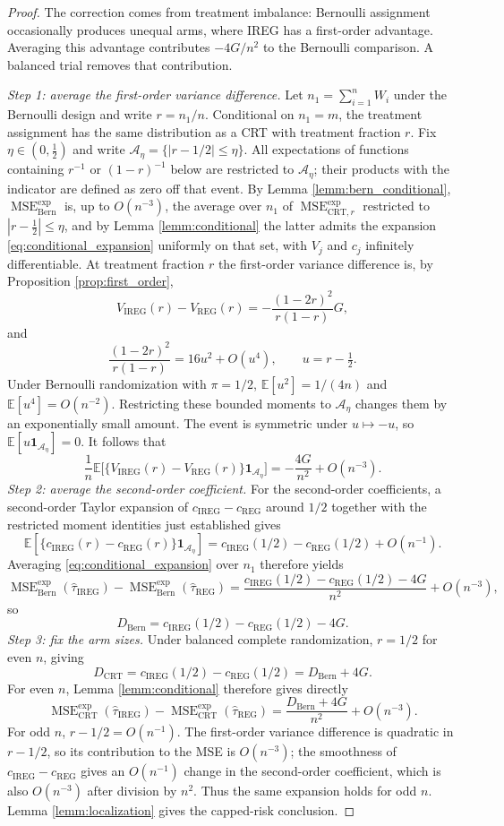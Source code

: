 \documentclass{article}
\newcommand{\EEE}{\mathbb{E}}
\DeclareMathOperator{\MSE}{MSE}
\newcommand{\Bern}{\mathrm{Bern}}
\newcommand{\CRT}{\mathrm{CRT}}
\newcommand{\IREG}{\mathrm{IREG}}
\newcommand{\REG}{\mathrm{REG}}
\newcommand{\MSEexp}{\MSE^{\mathrm{exp}}}
\theoremstyle{plain}
\theoremstyle{definition}
\theoremstyle{remark}
\begin{document}
\begin{proof}
The correction comes from treatment imbalance: Bernoulli assignment
occasionally produces unequal arms, where IREG has a first-order
advantage. Averaging this advantage contributes $-4G/n^2$ to the
Bernoulli comparison. A balanced trial removes that contribution.

\emph{Step 1: average the first-order variance difference.}
Let $n_1=\sum_{i=1}^n W_i$ under the Bernoulli design and write
$r=n_1/n$. Conditional on $n_1=m$, the treatment assignment has the same distribution as a CRT with treatment fraction $r$. Fix
$\eta\in(0,\frac12)$ and write
$\mathcal A_\eta=\{|r-1/2|\le\eta\}$. All expectations of
functions containing $r^{-1}$ or $(1-r)^{-1}$ below are restricted to
$\mathcal A_\eta$; their products with the indicator are defined
as zero off that event. By Lemma \ref{lemm:bern_conditional}, $\MSEexp_\Bern$ is, up to $O(n^{-3})$, the average over $n_1$ of
$\MSEexp_{\CRT,r}$ restricted to $|r-\frac12|\le\eta$, and by Lemma \ref{lemm:conditional} the latter admits the expansion \eqref{eq:conditional_expansion} uniformly on that set, with $V_j$ and $c_j$ infinitely differentiable. At treatment fraction $r$ the first-order variance difference is, by Proposition
\ref{prop:first_order},
\[
V_{\IREG}(r)-V_{\REG}(r)
=
-\frac{(1-2r)^2}{r(1-r)}G,
\]
and
\[
\frac{(1-2r)^2}{r(1-r)}
=
16u^2+O(u^4),
\qquad
u=r-\tfrac12.
\]
Under Bernoulli randomization with $\pi=1/2$,
$\EEE[u^2]=1/(4n)$ and $\EEE[u^4]=O(n^{-2})$.
Restricting these bounded moments to $\mathcal A_\eta$ changes
them by an exponentially small amount. The event is symmetric under
$u\mapsto-u$, so $\EEE[u\mathbf 1_{\mathcal A_\eta}]=0$.
It follows that
\[
\frac{1}{n}
\EEE\big[\{V_{\IREG}(r)-V_{\REG}(r)\}\mathbf 1_{\mathcal A_\eta}\big]
=
-\frac{4G}{n^2}+O(n^{-3}).
\]
\emph{Step 2: average the second-order coefficient.}
For the second-order coefficients, a second-order Taylor expansion of
$c_\IREG-c_\REG$ around $1/2$ together with the restricted moment identities just established gives
\[
\EEE[\{c_{\IREG}(r)-c_{\REG}(r)\}\mathbf 1_{\mathcal A_\eta}]
=
c_{\IREG}(1/2)-c_{\REG}(1/2)+O(n^{-1}).
\]
Averaging \eqref{eq:conditional_expansion} over $n_1$ therefore yields
\[
\MSEexp_{\Bern}(\hat{\tau}_\IREG)
-
\MSEexp_{\Bern}(\hat{\tau}_\REG)
=
\frac{
c_{\IREG}(1/2)-c_{\REG}(1/2)-4G
}{n^2}
+O(n^{-3}),
\]
so
\[
D_{\Bern}
=
c_{\IREG}(1/2)-c_{\REG}(1/2)-4G.
\]
\emph{Step 3: fix the arm sizes.}
Under balanced complete randomization, $r=1/2$ for even $n$, giving
\[
D_{\CRT}
=
c_{\IREG}(1/2)-c_{\REG}(1/2)
=
D_{\Bern}+4G.
\]
For even $n$, Lemma \ref{lemm:conditional} therefore gives directly
\[
\MSEexp_\CRT(\hat{\tau}_\IREG)-\MSEexp_\CRT(\hat{\tau}_\REG)
=
\frac{D_{\Bern}+4G}{n^2}+O(n^{-3}).
\]
For odd $n$, $r-1/2=O(n^{-1})$. The first-order variance difference is
quadratic in $r-1/2$, so its contribution to the MSE is $O(n^{-3})$;
the smoothness of $c_\IREG-c_\REG$ gives an $O(n^{-1})$ change in the
second-order coefficient, which is also $O(n^{-3})$ after division by
$n^2$. Thus the same expansion holds for odd $n$. Lemma \ref{lemm:localization} gives the capped-risk conclusion.
\end{proof}
\end{document}

